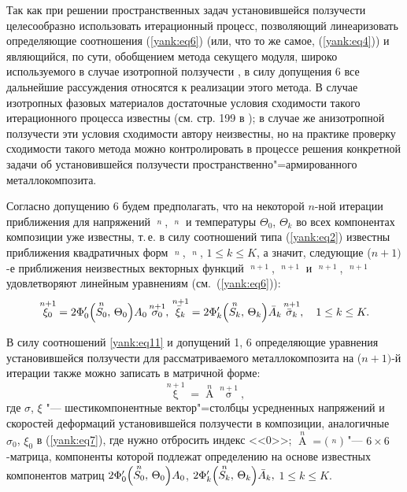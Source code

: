 Так как при решении пространственных задач установившейся
ползучести целесообразно использовать итерационный процесс,
позволяющий линеаризовать определяющие соотношения
(\ref{yank:eq6}) (или, что то же самое, (\ref{yank:eq4})) и
являющийся, по сути, обобщением метода секущего модуля, широко
используемого в случае изотропной ползучести \cite{yank:bib8}, 
в силу допущения 6 все дальнейшие рассуждения относятся к
реализации этого метода. В случае изотропных фазовых материалов
достаточные условия сходимости такого итерационного процесса
известны (см. стр. 199 в \cite{yank:bib9}); в случае же
анизотропной ползучести эти условия сходимости автору неизвестны,
но на практике проверку сходимости такого метода можно
контролировать в процессе решения конкретной задачи об
установившейся ползучести пространственно"=армированного
металлокомпозита.

Согласно допущению 6 будем предполагать, что на некоторой $n$-ной
итерации приближения для напряжений $\mathop {\sigma _{ij}^{(0)}
}\limits^n $, $\mathop {\bar {\sigma }_{ij}^{(k)} }\limits^n $ и
температуры $\Theta _0 $, $\Theta _k $ во всех компонентах
композиции уже известны, т.\,е. в силу соотношений типа
(\ref{yank:eq2}) известны приближения квадратичных форм $\mathop
{S_0 }\limits^n $, $\mathop {S_k }\limits^n $, $1\le k\le K$, а
значит, следующие ($n+1)$-е приближения неизвестных векторных
функций $\mathop {\xi _0 }\limits^{n+1} $, $\mathop {\bar {\xi }_k
}\limits^{n+1} $ и $\mathop {\sigma _0 }\limits^{n+1} $, $\mathop
{\bar {\sigma }_k }\limits^{n+1} $ удовлетворяют линейным
уравнениям (см.~(\ref{yank:eq6})):
\begin{equation}
\label{yank:eq11} \mathop {\xi _0 }\limits^{n+1} =2 \Phi'_0 \Bigl(
\mathop {S_0}\limits^n,\,\Theta _0 \Bigr)A_0 \mathop {\sigma _0
}\limits^{n+1},\,\mathop {\bar {\xi }_k }\limits^{n+1} =2 \Phi'_k
\Bigl( \mathop {S_k }\limits^n ,\,\Theta _k \Bigr) \bar {A}_k
\mathop {\bar {\sigma }_k }\limits^{n+1},\quad 1\le k\le K.
\end{equation}

В силу соотношений \eqref{yank:eq11} и допущений 1, 6 определяющие
уравнения установившейся ползучести для рассматриваемого
металлокомпозита на ($n+1)$-й итерации также можно записать в
матричной форме:
\begin{equation}
\label{yank:eq12}
\mathop \xi \limits^{n+1} =\mathop A\limits^n
\mathop \sigma \limits^{n+1} ,
\end{equation}
где $\sigma $, $\xi $ "--- шестикомпонентные вектор"=столбцы
усредненных напряжений и скоростей деформаций установившейся
ползучести в композиции, аналогичные $\sigma _0 $, $\xi _0 $ в
(\ref{yank:eq7}), где нужно отбросить индекс <<0>>; $\mathop
A\limits^n =\bigl( \mathop {a_{ij}}\limits^n \bigr)$ "--- $6
\times 6$-матрица, компоненты которой подлежат определению на
основе известных компонентов матриц $2 \Phi'_0 \Bigl(\mathop {S_0 }\limits^n ,\,\Theta _0 \Bigr)A_0 $, 
$2 \Phi'_k \Bigl(\mathop{S_k }\limits^n,\,\Theta _k \Bigr)\bar {A}_k,$ $1\le k\le K$.

